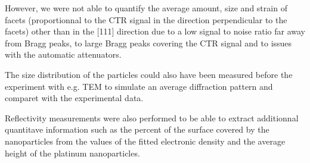 However, we were not able to quantify the average amount, size and strain of facets (proportionnal to the CTR signal in the direction perpendicular to the facets) other than in the [111] direction due to a low signal to noise ratio far away from Bragg peaks, to large Bragg peaks covering the CTR signal and to issues with the automatic attenuators.


The size distribution of the particles could also have been measured before the experiment with e.g. TEM to simulate an average diffraction pattern and comparet with the experimental data.

Reflectivity measurements were also performed to be able to extract additionnal quantitave information such as the percent of the surface covered by the nanoparticles from the values of the fitted electronic density and the average height of the platinum nanoparticles.